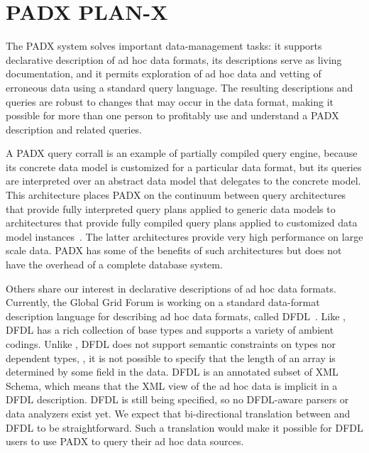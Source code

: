 \section{PADX PLAN-X}

The PADX{} system solves important data-management tasks: it supports
declarative description of ad hoc data formats, its descriptions serve
as living documentation, and it permits exploration of ad hoc data and
vetting of erroneous data using a standard query language.  The
resulting \pads{} descriptions and queries are robust to changes that
may occur in the data format, making it possible for more than one
person to profitably use and understand a PADX{} description and
related queries.

A PADX{} query corrall is an example of partially compiled query
engine, because its concrete data model is customized for a particular
data format, but its queries are interpreted over an abstract data
model that delegates to the concrete model.  This architecture places
PADX{} on the continuum between query architectures that provide
fully interpreted query plans applied to generic data models to
architectures that provide fully compiled query plans applied to
customized data model instances~\cite{daytona}.  The latter
architectures provide very high performance on large scale data.
PADX{} has some of the benefits of such architectures but does not
have the overhead of a complete database system. 

Others share our interest in declarative descriptions of ad hoc data
formats.    Currently, the Global Grid Forum is working on a standard
data-format description language for describing ad hoc data formats,
called DFDL{}~\cite{dfdl-proposal,dfdl-primer}.  Like \pads{},
DFDL{} has a rich collection of base types and supports a variety of
ambient codings.  Unlike \pads{}, DFDL{} does not support semantic
constraints on types nor dependent types, \eg{}, it is not possible to
specify that the length of an array is determined by some field in the
data.  DFDL{} is an annotated subset of XML{} Schema, which means
that the XML{} view of the ad hoc data is implicit in a DFDL{}
description.  DFDL{} is still being specified, so no DFDL{}-aware
parsers or data analyzers exist yet.  We expect that bi-directional
translation between \pads{} and DFDL{} to be straightforward.  Such a
translation would make it possible for DFDL{} users to use 
PADX{} to query their ad hoc data sources.

